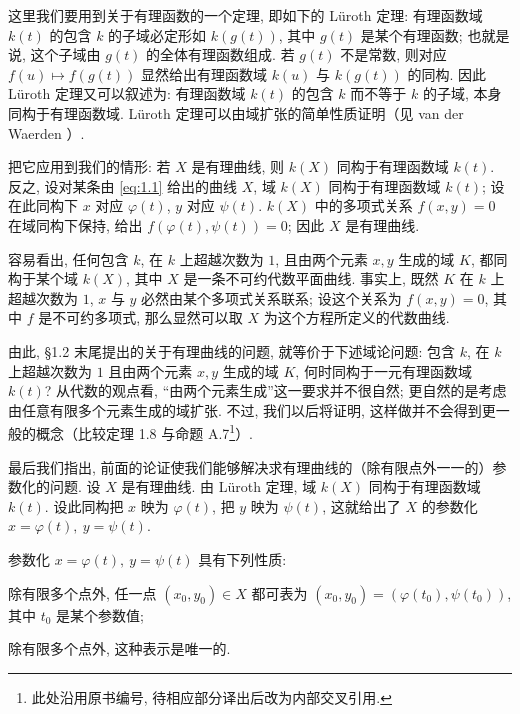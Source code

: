 这里我们要用到关于有理函数的一个定理, 即如下的 Lüroth 定理: 有理函数域 $k(t)$ 的包含 $k$ 的子域必定形如 $k(g(t))$, 其中 $g(t)$ 是某个有理函数; 也就是说, 这个子域由 $g(t)$ 的全体有理函数组成. 若 $g(t)$ 不是常数, 则对应 $f(u) \mapsto f(g(t))$ 显然给出有理函数域 $k(u)$ 与 $k(g(t))$ 的同构. 因此 Lüroth 定理又可以叙述为: 有理函数域 $k(t)$ 的包含 $k$ 而不等于 $k$ 的子域, 本身同构于有理函数域. Lüroth 定理可以由域扩张的简单性质证明（见 van der Waerden \cite[10.2, \S 73]{vdw1991}）.

把它应用到我们的情形: 若 $X$ 是有理曲线, 则 $k(X)$ 同构于有理函数域 $k(t)$. 反之, 设对某条由 \eqref{eq:1.1} 给出的曲线 $X$, 域 $k(X)$ 同构于有理函数域 $k(t)$; 设在此同构下 $x$ 对应 $\varphi(t)$, $y$ 对应 $\psi(t)$. $k(X)$ 中的多项式关系 $f(x,y) = 0$ 在域同构下保持, 给出 $f(\varphi(t), \psi(t)) = 0$; 因此 $X$ 是有理曲线.

容易看出, 任何包含 $k$, 在 $k$ 上超越次数为 $1$, 且由两个元素 $x, y$ 生成的域 $K$, 都同构于某个域 $k(X)$, 其中 $X$ 是一条不可约代数平面曲线. 事实上, 既然 $K$ 在 $k$ 上超越次数为 $1$, $x$ 与 $y$ 必然由某个多项式关系联系; 设这个关系为 $f(x,y) = 0$, 其中 $f$ 是不可约多项式, 那么显然可以取 $X$ 为这个方程所定义的代数曲线.

由此, §1.2 末尾提出的关于有理曲线的问题, 就等价于下述域论问题: 包含 $k$, 在 $k$ 上超越次数为 $1$ 且由两个元素 $x, y$ 生成的域 $K$, 何时同构于一元有理函数域 $k(t)$? 从代数的观点看, ``由两个元素生成''这一要求并不很自然; 更自然的是考虑由任意有限多个元素生成的域扩张. 不过, 我们以后将证明, 这样做并不会得到更一般的概念（比较定理 1.8 与命题 A.7\footnote{此处沿用原书编号, 待相应部分译出后改为内部交叉引用.}）.

最后我们指出, 前面的论证使我们能够解决求有理曲线的（除有限点外一一的）参数化的问题. 设 $X$ 是有理曲线. 由 Lüroth 定理, 域 $k(X)$ 同构于有理函数域 $k(t)$. 设此同构把 $x$ 映为 $\varphi(t)$, 把 $y$ 映为 $\psi(t)$, 这就给出了 $X$ 的参数化 $x = \varphi(t),\ y = \psi(t)$.

\begin{proposition}\label{prop:generic-bijection}
	参数化 $x = \varphi(t),\ y = \psi(t)$ 具有下列性质:
	\begin{compactenum}[(i)]
		\item 除有限多个点外, 任一点 $(x_0, y_0) \in X$ 都可表为 $(x_0, y_0) = (\varphi(t_0), \psi(t_0))$, 其中 $t_0$ 是某个参数值;
		\item 除有限多个点外, 这种表示是唯一的.
	\end{compactenum}
\end{proposition}

